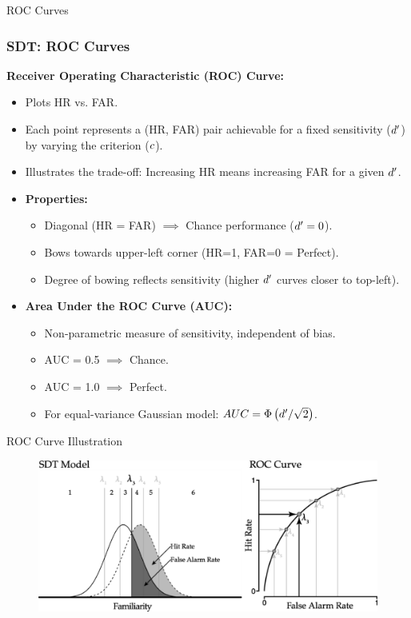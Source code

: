 \documentclass[aspectratio=169]{beamer}
\begin{document}
\begin{frame}{ROC Curves}
  \frametitle{SDT: ROC Curves}
  \textbf{Receiver Operating Characteristic (ROC) Curve:}
  \begin{itemize}
    \item Plots HR vs. FAR.
    \item Each point represents a (HR, FAR) pair achievable for a fixed sensitivity ($d'$) by varying the criterion ($c$).
    \item Illustrates the trade-off: Increasing HR means increasing FAR for a given $d'$.
    \pause
    \item \textbf{Properties:}
    \begin{itemize}
      \item Diagonal (HR = FAR) $\implies$ Chance performance ($d' = 0$).
      \item Bows towards upper-left corner (HR=1, FAR=0 = Perfect).
      \item Degree of bowing reflects sensitivity (higher $d'$ curves closer to top-left).
    \end{itemize}
    \pause
    \item \textbf{Area Under the ROC Curve (AUC):}
    \begin{itemize}
      \item Non-parametric measure of sensitivity, independent of bias.
      \item AUC = 0.5 $\implies$ Chance.
      \item AUC = 1.0 $\implies$ Perfect.
      \item For equal-variance Gaussian model: $AUC = \Phi\left(d' / \sqrt{2}\right)$.
    \end{itemize}
  \end{itemize}
\end{frame}

\begin{frame}{ROC Curve Illustration}
    \begin{figure}
        \centering
        \includegraphics[width=\textwidth]{figures/basicroc.pdf}
    \end{figure}
\end{frame}
\end{document}
